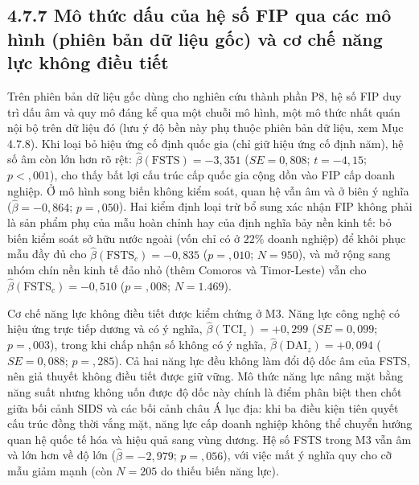 \documentclass[
  a4paper,
  13pt]{extreport}
\begin{document}
\hypertarget{muxf4-thux1ee9c-dux1ea5u-cux1ee7a-hux1ec7-sux1ed1-fip-qua-cuxe1c-muxf4-huxecnh-phiuxean-bux1ea3n-dux1eef-liux1ec7u-gux1ed1c-vuxe0-cux1a1-chux1ebf-nux103ng-lux1ef1c-khuxf4ng-ux111iux1ec1u-tiux1ebft}{%
\subsection{4.7.7 Mô thức dấu của hệ số FIP qua các mô hình (phiên bản
dữ liệu gốc) và cơ chế năng lực không điều
tiết}\label{muxf4-thux1ee9c-dux1ea5u-cux1ee7a-hux1ec7-sux1ed1-fip-qua-cuxe1c-muxf4-huxecnh-phiuxean-bux1ea3n-dux1eef-liux1ec7u-gux1ed1c-vuxe0-cux1a1-chux1ebf-nux103ng-lux1ef1c-khuxf4ng-ux111iux1ec1u-tiux1ebft}}

Trên phiên bản dữ liệu gốc dùng cho nghiên cứu thành phần P8, hệ số FIP
duy trì dấu âm và quy mô đáng kể qua một chuỗi mô hình, một mô thức nhất
quán nội bộ trên dữ liệu đó (lưu ý độ bền này phụ thuộc phiên bản dữ
liệu, xem Mục 4.7.8). Khi loại bỏ hiệu ứng cố định quốc gia (chỉ giữ
hiệu ứng cố định năm), hệ số âm còn lớn hơn rõ rệt:
\(\hat{\beta}(\text{FSTS}) = -3{,}351\) (\(SE = 0{,}808\);
\(t = -4{,}15\); \(p < {,}001\)), cho thấy bất lợi cấu trúc cấp quốc gia
cộng dồn vào FIP cấp doanh nghiệp. Ở mô hình song biến không kiểm soát,
quan hệ vẫn âm và ở biên ý nghĩa (\(\hat{\beta} = -0{,}864\);
\(p = {,}050\)). Hai kiểm định loại trừ bổ sung xác nhận FIP không phải
là sản phẩm phụ của mẫu hoàn chỉnh hay của định nghĩa bảy nền kinh tế:
bỏ biến kiểm soát sở hữu nước ngoài (vốn chỉ có ở \(22\%\) doanh nghiệp)
để khôi phục mẫu đầy đủ cho \(\hat{\beta}(\text{FSTS}_c) = -0{,}835\)
(\(p = {,}010\); \(N = 950\)), và mở rộng sang nhóm chín nền kinh tế đảo
nhỏ (thêm Comoros và Timor-Leste) vẫn cho
\(\hat{\beta}(\text{FSTS}_c) = -0{,}510\) (\(p = {,}008\);
\(N = 1.469\)).

Cơ chế năng lực không điều tiết được kiểm chứng ở M3. Năng lực công nghệ
có hiệu ứng trực tiếp dương và có ý nghĩa,
\(\hat{\beta}(\text{TCI}_z) = +0{,}299\) (\(SE = 0{,}099\);
\(p = {,}003\)), trong khi chấp nhận số không có ý nghĩa,
\(\hat{\beta}(\text{DAI}_z) = +0{,}094\) (\(SE = 0{,}088\);
\(p = {,}285\)). Cả hai năng lực đều không làm đổi độ dốc âm của FSTS,
nên giả thuyết không điều tiết được giữ vững. Mô thức năng lực nâng mặt
bằng năng suất nhưng không uốn được độ dốc này chính là điểm phân biệt
then chốt giữa bối cảnh SIDS và các bối cảnh châu Á lục địa: khi ba điều
kiện tiên quyết cấu trúc đồng thời vắng mặt, năng lực cấp doanh nghiệp
không thể chuyển hướng quan hệ quốc tế hóa và hiệu quả sang vùng dương.
Hệ số FSTS trong M3 vẫn âm và lớn hơn về độ lớn
(\(\hat{\beta} = -2{,}979\); \(p = {,}056\)), với việc mất ý nghĩa quy
cho cỡ mẫu giảm mạnh (còn \(N = 205\) do thiếu biến năng lực).
\end{document}
